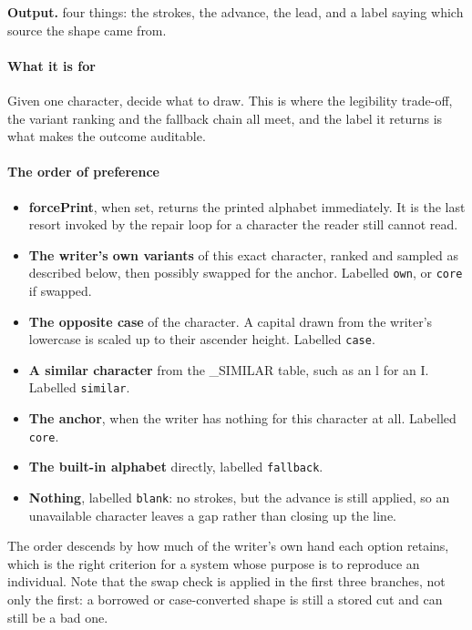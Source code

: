 \noindent\textbf{Output.} four things: the strokes, the advance, the lead, and a label saying which source the shape came from.


\paragraph{What it is for}
Given one character, decide what to draw. This is where the legibility trade-off, the variant ranking and the fallback chain all meet, and the label it returns is what makes the outcome auditable.


\paragraph{The order of preference}

\begin{itemize}\setlength\itemsep{0pt}
  \item \textbf{forcePrint}, when set, returns the printed alphabet immediately. It is the last resort invoked by the repair loop for a character the reader still cannot read.
  \item \textbf{The writer's own variants} of this exact character, ranked and sampled as described below, then possibly swapped for the anchor. Labelled \texttt{own}, or \texttt{core} if swapped.
  \item \textbf{The opposite case} of the character. A capital drawn from the writer's lowercase is scaled up to their ascender height. Labelled \texttt{case}.
  \item \textbf{A similar character} from the \_SIMILAR table, such as an l for an I. Labelled \texttt{similar}.
  \item \textbf{The anchor}, when the writer has nothing for this character at all. Labelled \texttt{core}.
  \item \textbf{The built-in alphabet} directly, labelled \texttt{fallback}.
  \item \textbf{Nothing}, labelled \texttt{blank}: no strokes, but the advance is still applied, so an unavailable character leaves a gap rather than closing up the line.
\end{itemize}
The order descends by how much of the writer's own hand each option retains, which is the right criterion for a system whose purpose is to reproduce an individual. Note that the swap check is applied in the first three branches, not only the first: a borrowed or case-converted shape is still a stored cut and can still be a bad one.



